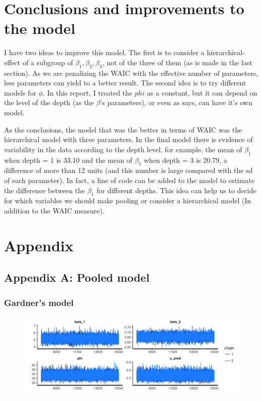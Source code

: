 \documentclass{article}
\begin{document}
\section{Conclusions and improvements to the model}


I have two ideas to improve this model. The first is to consider a hierarchical-effect of a subgroup of ${\beta_1, \beta_2, \beta_3}$, not of the three of them (as is made in the last section). As we are penalizing the WAIC with the effective number of parameters, less parameters can yield to a better result. The second idea is to try different models for $\phi$. In this report, I treated the $phi$ as a constant, but it can depend on the level of the depth (as the $\beta$'s parameters), or even as \cite{cribari2009beta} says, can have it's own model.

As the conclusions, the model that was the better in terms of WAIC was the hierarchical model with three parameters. In the final model there is evidence of variability in the data according to the depth level, for example, the mean of $\beta_1$ when depth = 1 is 33.10 and the mean of $\beta_1$ when depth = 3 is 20.79, a difference of more than 12 units (and this number is large compared with the sd of each parameter). In fact, a line of code can be added to the model to estimate the difference between the $\beta_1$ for different depths. This idea can help us to decide for which variables we should make pooling or consider a hierarchical model (In addition to the WAIC measure).
\newpage
\section{Appendix}
\subsection*{Appendix A: Pooled model}
\subsubsection*{\textbf{Gardner's model}}

\begin{figure}[ht!]
\centering
\includegraphics[width=16cm, height = 5 cm]{pooled_2pars_trace.png}
\end{figure}
\end{document}

